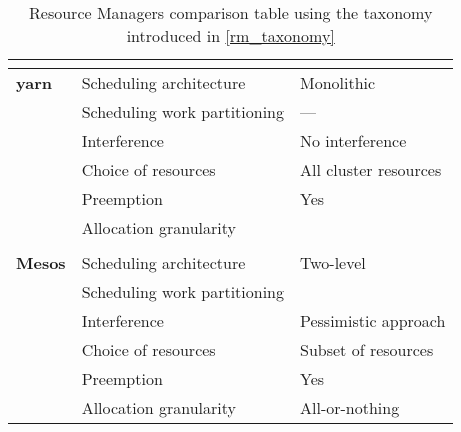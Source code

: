 \begin{table}[h]
\begin{center}
\begin{tabular}{lll}
\multicolumn{3}{c}{} \\ \hline
\multicolumn{1}{l|}{\textbf{\glsdesc{yarn}}} 
                                   & Scheduling architecture      & Monolithic              \\ \cline{2-3} 
\multicolumn{1}{l|}{}              & Scheduling work partitioning & ---                     \\ \cline{2-3} 
\multicolumn{1}{l|}{}              & Interference                 & No interference         \\ \cline{2-3} 
\multicolumn{1}{l|}{}              & Choice of resources          & All cluster resources   \\ \cline{2-3} 
\multicolumn{1}{l|}{}              & Preemption                   & Yes                     \\ \cline{2-3} 
\multicolumn{1}{l|}{}              & Allocation granularity       &                         \\ \cline{2-3}

\multicolumn{3}{c}{} \\ \hline
\multicolumn{1}{l|}{\textbf{Mesos \cite{mesos}}} 
                                   & Scheduling architecture      & Two-level               \\ \cline{2-3} 
\multicolumn{1}{l|}{}              & Scheduling work partitioning &                         \\ \cline{2-3} 
\multicolumn{1}{l|}{}              & Interference                 & Pessimistic approach    \\ \cline{2-3} 
\multicolumn{1}{l|}{}              & Choice of resources          & Subset of resources     \\ \cline{2-3} 
\multicolumn{1}{l|}{}              & Preemption                   & Yes                     \\ \cline{2-3} 
\multicolumn{1}{l|}{}              & Allocation granularity       & All-or-nothing                    

\end{tabular}
\end{center}
\caption{Resource Managers comparison table using the taxonomy introduced in \autoref{rm_taxonomy}}
\label{my-label}
\end{table}